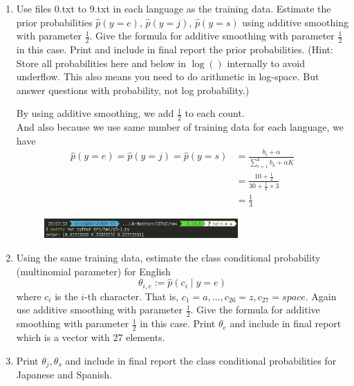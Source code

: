 \documentclass[a4paper]{article}
\theoremstyle{definition}
\newenvironment{soln}{
    \leavevmode\color{blue}\ignorespaces
}{}
\begin{document}
\begin{enumerate}
	\item
	      Use files 0.txt to 9.txt in each language as the training data.
	      Estimate the prior probabilities
	      $\hat p(y=e)$,
	      $\hat p(y=j)$,
	      $\hat p(y=s)$
	      using additive smoothing with parameter $\frac{1}{2}$.
	      Give the formula for additive smoothing with parameter $\frac{1}{2}$ in this case.
	      Print and include in final report the prior probabilities.
	      (Hint: Store all probabilities here and below in $\log()$ internally to avoid underflow. This also means you need to do arithmetic in log-space.  But answer questions with probability, not log probability.)

	      \begin{soln}
		      By using additive smoothing, we add $\frac{1}{2}$ to each count.\\
					And also because we use same number of training data for each language, we have
		      \begin{align*}
			      \hat p(y=e) = \hat p(y=j)= \hat p(y=s) & = \frac{b_i + \alpha}{\sum_{i=1}^{k}b_k + \alpha K} \\
			                                             & =  \frac{10+\frac{1}{2}}{30 + \frac{1}{2} \times 3} \\
			                                             & = \frac{1}{3}
		      \end{align*}
		      \begin{figure}[h]
			      \centering
			      \includegraphics[width=0.7\textwidth]{img/q3_1.png}
		      \end{figure}
	      \end{soln}

	\item
	      Using the same training data, estimate the class conditional probability (multinomial parameter) for English
	      $$\theta_{i,e} := \hat p(c_i \mid y=e)$$
	      where $c_i$ is the $i$-th character. That is, $c_1 = a, \ldots, c_{26} = z, c_{27} = space$.
	      Again use additive smoothing with parameter $\frac{1}{2}$.
	      Give the formula for additive smoothing with parameter $\frac{1}{2}$ in this case.
	      Print $\theta_e$ and include in final report which is a vector with 27 elements.


	\item
	      Print $\theta_j, \theta_s$ and include in final report the class conditional probabilities for Japanese and Spanish.


\end{enumerate}
\end{document}

